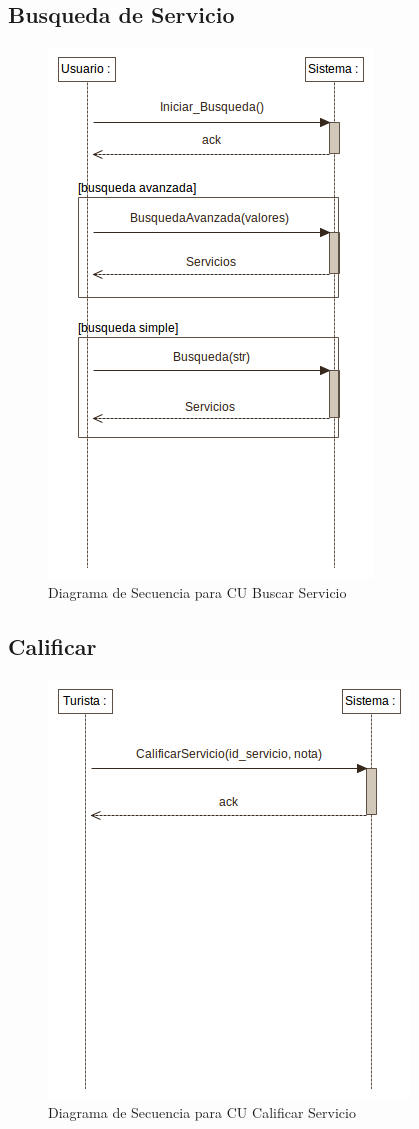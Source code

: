 \documentclass[12pt]{article}
\begin{document}
\subsection{Busqueda de Servicio}
\begin{center}\begin{figure}[htp]
\centering
\includegraphics[scale=0.50]{Diagramas/Secuencia/busqueda_servicio.png}
\caption{Diagrama de Secuencia para CU Buscar Servicio }
\label{}
\end{figure}\end{center}
\subsection{Calificar}
\begin{figure}[htp]
\centering
\includegraphics[scale=0.41]{Diagramas/Secuencia/calificar.png}
\caption{Diagrama de Secuencia para CU Calificar Servicio}
\label{}
\end{figure}
\newpage
\end{document}
